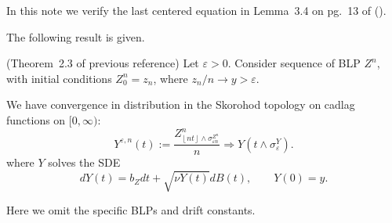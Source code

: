 
In this note we verify the last centered equation in Lemma~3.4 on pg.~13 of (\cite{kosyginaFunctionalLimitLaws2016}).

The following result is given.
\begin{theorem}(Theorem~2.3 of previous reference)
	Let $\varepsilon>0$. Consider sequence of BLP $Z^n$, with initial conditions $Z^n_0 = z_n$, where $z_n / n \to y > \varepsilon$.

	We have convergence in distribution in the Skorohod topology on cadlag functions on $[0,\infty )$:
	\[
		Y^{\varepsilon, n}(t) := \frac{Z^n_{\left\lfloor nt  \right\rfloor \wedge \sigma_{\varepsilon n}^{Z^n}}}{n}
		\Rightarrow
		Y(t \wedge \sigma_\varepsilon^Y)
	.\] 
	where $Y$ solves the SDE
	\[
		dY (t) = b_Z d t + \sqrt{ \nu Y(t)}  d B(t), \qquad Y(0) = y
	.\] 
\end{theorem}
Here we omit the specific BLPs and drift constants.

